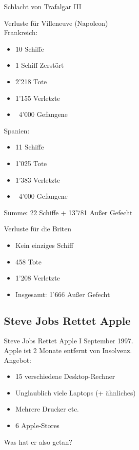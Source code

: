 \begin{frame}{Schlacht von Trafalgar III}
    \begin{multicols}{2}
        Verluste für Villeneuve (Napoleon) \\
        Frankreich:
        \begin{itemize}
            \item<2-> 10 Schiffe
            \item<2-> 1 Schiff Zerstört
            \item<3-> 2'218 Tote
            \item<3-> 1'155 Verletzte
            \item<4-> ~4'000 Gefangene
        \end{itemize}
        Spanien:
        \begin{itemize}
            \item<2-> 11 Schiffe
            \item<3-> 1'025 Tote
            \item<3-> 1'383 Verletzte
            \item<4-> ~4'000 Gefangene
        \end{itemize}
         {Summe: 22 Schiffe + 13'781 Außer Gefecht}


        Verluste für die Briten
        \begin{itemize}
            \item<2-> Kein einziges Schiff
            \item<3-> 458 Tote
            \item<3-> 1'208 Verletzte
            \item<5-> Insgesamt: 1'666 Außer Gefecht
        \end{itemize}

        \pause
        \pause
        \pause
        \pause

    \end{multicols}

\end{frame}



\subsection{Steve Jobs Rettet Apple}

\begin{frame}{Steve Jobs Rettet Apple I}
    September 1997. \\
    Apple ist 2 Monate entfernt von Insolvenz. \\
    \pause
    Angebot: \\
    \begin{itemize}
        \item 15 verschiedene Desktop-Rechner
        \item Unglaublich viele Laptops (+ ähnliches)
        \item Mehrere Drucker etc.
        \item 6 Apple-Stores
    \end{itemize}
    \pause

    Was hat er also getan?

\end{frame}

